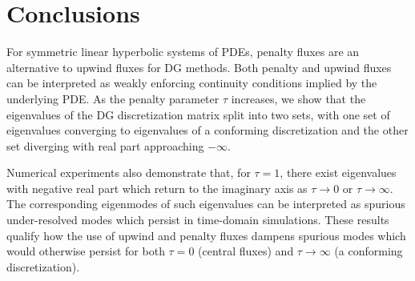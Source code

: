 \documentclass[preprint,10pt]{elsarticle}
\begin{document}
\section{Conclusions}

For symmetric linear hyperbolic systems of PDEs, penalty fluxes are an alternative to upwind fluxes for DG methods.  Both penalty and upwind fluxes can be interpreted as weakly enforcing continuity conditions implied by the underlying PDE.  As the penalty parameter $\tau$ increases, we show that the eigenvalues of the DG discretization matrix split into two sets, with one set of eigenvalues converging to eigenvalues of a conforming discretization and the other set diverging with real part approaching $-\infty$.  

Numerical experiments also demonstrate that, for $\tau = 1$, there exist eigenvalues with negative real part which return to the imaginary axis as $\tau \rightarrow 0$ or $\tau\rightarrow \infty$.  The corresponding eigenmodes of such eigenvalues can be interpreted as spurious under-resolved modes which persist in time-domain simulations.  These results qualify how the use of upwind and penalty fluxes dampens spurious modes which would otherwise persist for both $\tau = 0$ (central fluxes) and $\tau \rightarrow\infty$ (a conforming discretization).  



\end{document}
